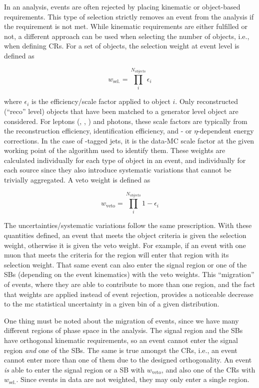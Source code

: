 In an analysis, events are often rejected by placing kinematic or object-based requirements. This type of selection strictly removes an event from the analysis if the requirement is not met. While kinematic requirements are either fulfilled or not, a different approach can be used when selecting the number of objects, i.e., when defining \glspl{CR}. For a set of objects, the selection weight at event level is defined as

\begin{equation}
    w_{\mathrm{sel.}} = \prod_i^{N_\mathrm{objects}} \epsilon_i
    \label{eq:event_selection_weight}
\end{equation}

where $\epsilon_i$ is the efficiency/scale factor applied to object $i$. Only reconstructed (``reco'' level) objects that have been matched to a generator level object are considered. For leptons (\Pe, \Pmu, \Ptau) and photons, these scale factors are typically from the reconstruction efficiency, identification efficiency, and \pt- or $\eta$-dependent energy corrections. In the case of \Pqb-tagged jets, it is the data-MC scale factor at the given working point of the algorithm used to identify them. These weights are calculated individually for each type of object in an event, and individually for each source since they also introduce systematic variations that cannot be trivially aggregated. A veto weight is defined as

\begin{equation}
    w_{\mathrm{veto}} = \prod_i^{N_\mathrm{objects}} 1 - \epsilon_i
    \label{eq:event_veto_weight}
\end{equation}

The uncertainties/systematic variations follow the same prescription. With these quantities defined, an event that meets the object criteria is given the selection weight, otherwise it is given the veto weight. For example, if an event with one muon that meets the criteria for the \singleMuCr region will enter that region with its selection weight. That same event can also enter the signal region or one of the \glspl{SB} (depending on the event kinematics) with the veto weights. This ``migration'' of events, where they are able to contribute to more than one region, and the fact that weights are applied instead of event rejection, provides a noticeable decrease to the \acrlong{mc} statistical uncertainty in a given bin of a given distribution.

One thing must be noted about the migration of events, since we have many different regions of phase space in the analysis. The signal region and the \glspl{SB} have orthogonal kinematic requirements, so an event cannot enter the signal region \emph{and} one of the \glspl{SB}. The same is true amongst the \glspl{CR}, i.e., an event cannot enter more than one of them due to the designed orthogonality. An event \emph{is} able to enter the signal region or a \gls{SB} with $w_{\mathrm{veto}}$, and also one of the \glspl{CR} with $w_{\mathrm{sel.}}$. Since events in data are not weighted, they may only enter a single region.


